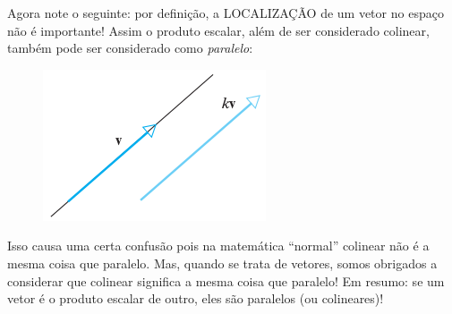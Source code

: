 \documentclass[pdftex, brazil, 12pt, twoside]{article}
\begin{document}
Agora note o seguinte: por definição, a LOCALIZAÇÃO de um vetor no espaço
não é importante! Assim o produto escalar, além de ser considerado colinear,
também pode ser considerado como \emph{paralelo}:

\begin{figure}[H]
  \begin{center}
    \includegraphics[scale=0.6]{imagens/vet014.png}
  \end{center}
\end{figure}

Isso causa uma certa confusão pois na matemática ``normal'' colinear não é a
mesma coisa que paralelo. Mas, quando se trata de vetores, somos obrigados a
considerar que colinear significa a mesma coisa que paralelo! Em resumo: se
um vetor é o produto escalar de outro, eles são paralelos (ou colineares)!



\end{document}
